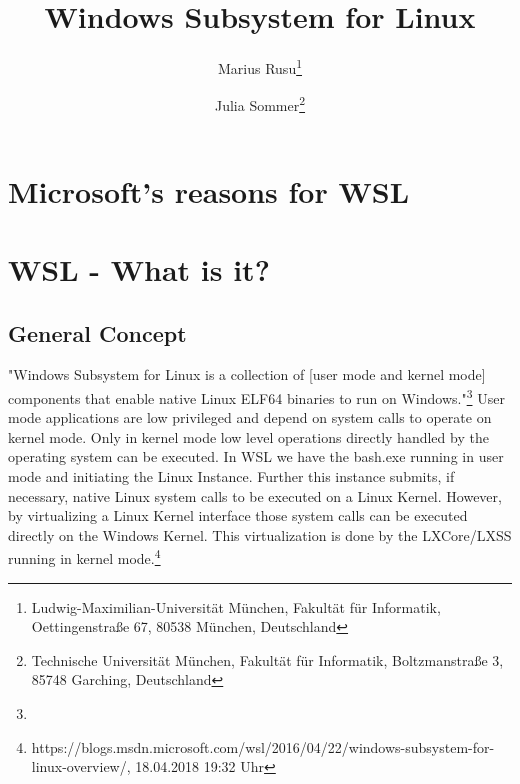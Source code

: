 \documentclass[utf8,biblatex]{lni}
\begin{document}
\title[Ein Kurztitel]{Windows Subsystem for Linux}
\author[Marius Rusu \and Julia Sommer]
{Marius Rusu\footnote{Ludwig-Maximilian-Universität München, Fakultät für Informatik, Oettingenstraße 67, 80538 München, Deutschland } \and
 Julia Sommer\footnote{Technische Universität München, Fakultät für Informatik, Boltzmanstraße 3, 85748 Garching, Deutschland }}
\maketitle

\begin{abstract}

\end{abstract}


\section{Microsoft's reasons for WSL}

\section{WSL - What is it?}


\subsection{General Concept}
"Windows Subsystem for Linux is a collection of [user mode and kernel mode] components that enable native Linux ELF64 binaries to run on Windows."\footnote{} User mode applications are low privileged and depend on system calls to operate on kernel mode. Only in kernel mode low level operations directly handled by the operating system can be executed. In WSL we have the bash.exe running in user mode and initiating the Linux Instance. Further this instance submits, if necessary, native Linux system calls to be executed on a Linux Kernel. However, by virtualizing a Linux Kernel interface those system calls can be executed directly on the Windows Kernel. This virtualization is done by the LXCore/LXSS running in kernel mode.\footnote{ https://blogs.msdn.microsoft.com/wsl/2016/04/22/windows-subsystem-for-linux-overview/, 18.04.2018 19:32 Uhr}
\end{document}
